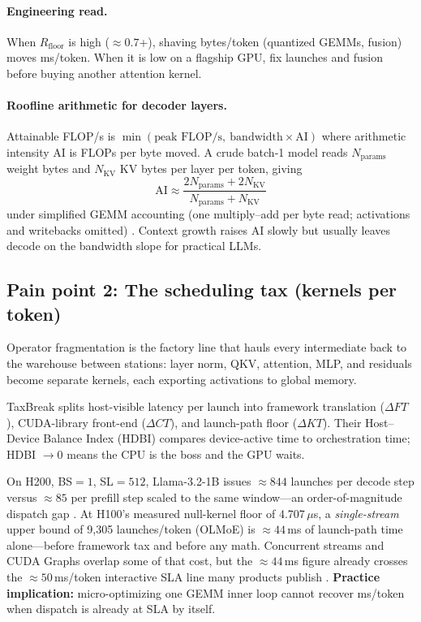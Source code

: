 \paragraph{Engineering read.}
When $R_{\mathrm{floor}}$ is high (${\approx}0.7$+), shaving bytes/token (quantized GEMMs, fusion) moves ms/token.
When it is low on a flagship GPU, fix launches and fusion before buying another attention kernel.

\paragraph{Roofline arithmetic for decoder layers.}
Attainable FLOP/s is $\min(\text{peak FLOP/s},\ \text{bandwidth}\times\text{AI})$ where arithmetic intensity AI is FLOPs per byte moved.
A crude batch-1 model reads $N_{\mathrm{params}}$ weight bytes and $N_{\mathrm{KV}}$ KV bytes per layer per token, giving
\[
 \mathrm{AI} \approx \frac{2N_{\mathrm{params}} + 2N_{\mathrm{KV}}}{N_{\mathrm{params}} + N_{\mathrm{KV}}}
\]
under simplified GEMM accounting (one multiply--add per byte read; activations and writebacks omitted) \citep{lazuka2024llmpilotcharacteri,patel2025llminference}.
Context growth raises AI slowly but usually leaves decode on the bandwidth slope for practical LLMs.



\subsection{Pain point 2: The scheduling tax (kernels per token)}
Operator fragmentation is the factory line that hauls every intermediate back to the warehouse between stations: layer norm, QKV, attention, MLP, and residuals become separate kernels, each exporting activations to global memory.

TaxBreak \citep{taxbreak2026} splits host-visible latency per launch into framework translation ($\Delta FT$), CUDA-library front-end ($\Delta CT$), and launch-path floor ($\Delta KT$).
Their Host--Device Balance Index (HDBI) compares device-active time to orchestration time; HDBI $\to 0$ means the CPU is the boss and the GPU waits.

On H200, BS${=}1$, SL${=}512$, Llama-3.2-1B issues ${\approx}844$ launches per decode step versus ${\approx}85$ per prefill step scaled to the same window---an order-of-magnitude dispatch gap \citep{taxbreak2026}.
At H100's measured null-kernel floor of 4.707\,$\mu$s, a \emph{single-stream} upper bound of 9,305 launches/token (OLMoE) is ${\approx}44$\,ms of launch-path time alone---before framework tax and before any math.
Concurrent streams and CUDA Graphs overlap some of that cost, but the ${\approx}44$\,ms figure already crosses the ${\approx}50$\,ms/token interactive SLA line many products publish \citep{taxbreak2026,memoryfloor2026}.
\textbf{Practice implication:} micro-optimizing one GEMM inner loop cannot recover ms/token when dispatch is already at SLA by itself.

